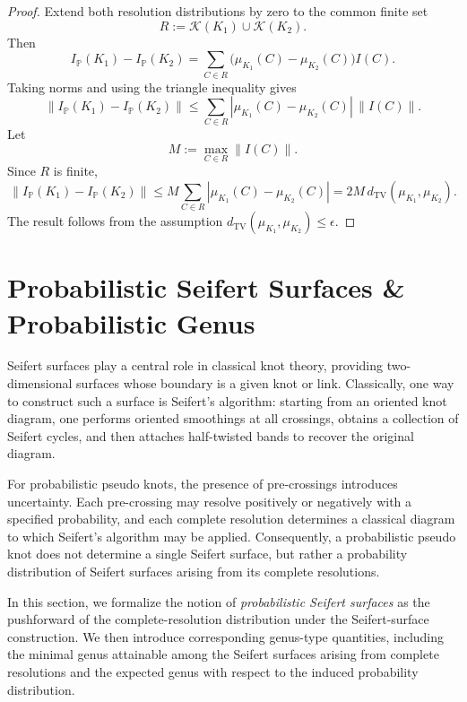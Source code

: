 \documentclass[a4paper, reqno, 12pt]{amsart}
\theoremstyle{plain}
\theoremstyle{definition}
\begin{document}
\begin{proof}
Extend both resolution distributions by zero to the common finite set
\[
R:=\mathcal K(K_1)\cup\mathcal K(K_2).
\]
Then
\[
I_{\mathbb P}(K_1)-I_{\mathbb P}(K_2)
=
\sum_{C\in R}
\big(\mu_{K_1}(C)-\mu_{K_2}(C)\big)I(C).
\]
Taking norms and using the triangle inequality gives
\[
\|I_{\mathbb P}(K_1)-I_{\mathbb P}(K_2)\|
\le
\sum_{C\in R}
|\mu_{K_1}(C)-\mu_{K_2}(C)|\,\|I(C)\|.
\]
Let
\[
M:=
\max_{C\in R}\|I(C)\|.
\]
Since \(R\) is finite,
\[
\|I_{\mathbb P}(K_1)-I_{\mathbb P}(K_2)\|
\le
M\sum_{C\in R}
|\mu_{K_1}(C)-\mu_{K_2}(C)|
=
2M\,d_{\mathrm{TV}}(\mu_{K_1},\mu_{K_2}).
\]
The result follows from the assumption
\(d_{\mathrm{TV}}(\mu_{K_1},\mu_{K_2})\le\epsilon\).
\end{proof}







\section{Probabilistic Seifert Surfaces \& Probabilistic Genus}\label{sec:probSeif}

Seifert surfaces play a central role in classical knot theory, providing two-dimensional surfaces whose boundary is a given knot or link. Classically, one way to construct such a surface is Seifert's algorithm: starting from an oriented knot diagram, one performs oriented smoothings at all crossings, obtains a collection of Seifert cycles, and then attaches half-twisted bands to recover the original diagram.

For probabilistic pseudo knots, the presence of pre-crossings introduces uncertainty. Each pre-crossing may resolve positively or negatively with a specified probability, and each complete resolution determines a classical diagram to which Seifert's algorithm may be applied. Consequently, a probabilistic pseudo knot does not determine a single Seifert surface, but rather a probability distribution of Seifert surfaces arising from its complete resolutions.

In this section, we formalize the notion of \emph{probabilistic Seifert surfaces} as the pushforward of the complete-resolution distribution under the Seifert-surface construction. We then introduce corresponding genus-type quantities, including the minimal genus attainable among the Seifert surfaces arising from complete resolutions and the expected genus with respect to the induced probability distribution.
\end{document}
